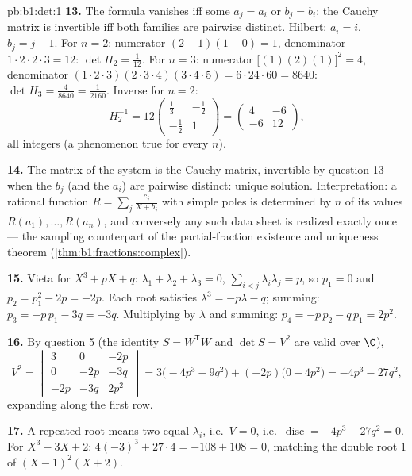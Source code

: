 \begin{solution}{pb:b1:det:1}
\textbf{13.} The formula vanishes iff some $a_j = a_i$ or $b_j =
b_i$: the Cauchy matrix is invertible iff both families are
pairwise distinct. Hilbert: $a_i = i$, $b_j = j - 1$. For $n =
2$: numerator $(2-1)(1-0) = 1$, denominator $1\cdot2\cdot2\cdot3
= 12$: $\det H_2 = \frac1{12}$. For $n = 3$: numerator
$\bigl[(1)(2)(1)\bigr]^2 = 4$, denominator $(1\cdot2\cdot3)
(2\cdot3\cdot4)(3\cdot4\cdot5) = 6\cdot24\cdot60 = 8640$:
$\det H_3 = \frac{4}{8640} = \frac1{2160}$. Inverse for $n = 2$:
\[
H_2^{-1} = 12\begin{pmatrix} \frac13 & -\frac12\\[2pt]
-\frac12 & 1\end{pmatrix}
= \begin{pmatrix} 4 & -6\\ -6 & 12 \end{pmatrix},
\]
all integers (a phenomenon true for every $n$).

\textbf{14.} The matrix of the system is the Cauchy matrix,
invertible by question 13 when the $b_j$ (and the $a_i$) are
pairwise distinct: unique solution. Interpretation: a rational
function $R = \sum_j \frac{c_j}{X + b_j}$ with simple poles is
determined by $n$ of its values $R(a_1), \dots, R(a_n)$, and
conversely any such data sheet is realized exactly once ---
the sampling counterpart of the partial-fraction existence and
uniqueness theorem (\cref{thm:b1:fractions:complex}).

\textbf{15.} Vieta for $X^3 + pX + q$: $\lambda_1 + \lambda_2 +
\lambda_3 = 0$, $\sum_{i<j}\lambda_i\lambda_j = p$, so $p_1 = 0$
and $p_2 = p_1^2 - 2p = -2p$. Each root satisfies $\lambda^3 =
-p\lambda - q$; summing: $p_3 = -p\,p_1 - 3q = -3q$. Multiplying
by $\lambda$ and summing: $p_4 = -p\,p_2 - q\,p_1 = 2p^2$.

\textbf{16.} By question 5 (the identity $S = W^{\mathsf T}W$
and $\det S = V^2$ are valid over $\C$),
\[
V^2 = \begin{vmatrix}
3 & 0 & -2p\\
0 & -2p & -3q\\
-2p & -3q & 2p^2
\end{vmatrix}
= 3\bigl(-4p^3 - 9q^2\bigr) + (-2p)\bigl(0 - 4p^2\bigr)
= -4p^3 - 27q^2 ,
\]
expanding along the first row.

\textbf{17.} A repeated root means two equal $\lambda_i$, i.e.\
$V = 0$, i.e.\ $\operatorname{disc} = -4p^3 - 27q^2 = 0$. For
$X^3 - 3X + 2$: $4(-3)^3 + 27\cdot4 = -108 + 108 = 0$, matching
the double root $1$ of $(X-1)^2(X+2)$.


\end{solution}
